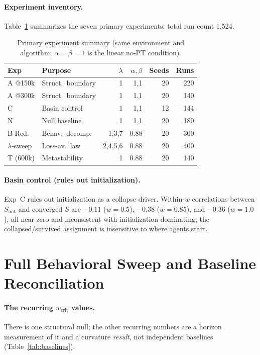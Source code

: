 \documentclass[letterpaper]{article} %
\theoremstyle{plain}
\newcommand{\wcrit}{w_{\mathrm{crit}}}
\begin{document}
\paragraph{Experiment inventory.}
Table~\ref{tab:experiments} summarizes the seven primary experiments; total run count 1{,}524.

\begin{table}[t]
\centering
\caption{Primary experiment summary (same environment and algorithm; $\alpha{=}\beta{=}1$ is
the linear no-PT condition).}
\label{tab:experiments}
\small
\setlength{\tabcolsep}{4pt}
\begin{tabular}{llrrrr}
\toprule
Exp & Purpose & $\lambda$ & $\alpha,\beta$ & Seeds & Runs \\
\midrule
A @150k & Struct.\ boundary & 1 & 1,1 & 20 & 220 \\
A @300k & Struct.\ boundary & 1 & 1,1 & 20 & 140 \\
C & Basin control & 1 & 1,1 & 12 & 144 \\
N & Null baseline & 1 & 1,1 & 20 & 180 \\
B-Red. & Behav.\ decomp. & 1,3,7 & 0.88 & 20 & 300 \\
$\lambda$-sweep & Loss-av.\ law & 2,4,5,6 & 0.88 & 20 & 400 \\
T (600k) & Metastability & 1 & 0.88 & 20 & 140 \\
\bottomrule
\end{tabular}
\end{table}

\paragraph{Basin control (rules out initialization).}
Exp~C rules out initialization as a collapse driver. Within-$w$ correlations between
$S_{\mathrm{init}}$ and converged $S$ are $-0.11$ ($w{=}0.5$), $-0.38$ ($w{=}0.85$), and
$-0.36$ ($w{=}1.0$), all near zero and inconsistent with initialization dominating; the
collapsed/survived assignment is insensitive to where agents start.

\section{Full Behavioral Sweep and Baseline Reconciliation}
\label{sec:s_results}

\paragraph{The recurring $\wcrit$ values.}
There is one structural null; the other recurring numbers are a horizon measurement of it and
a curvature \emph{result}, not independent baselines (Table~\ref{tab:baselines}).
\end{document}
